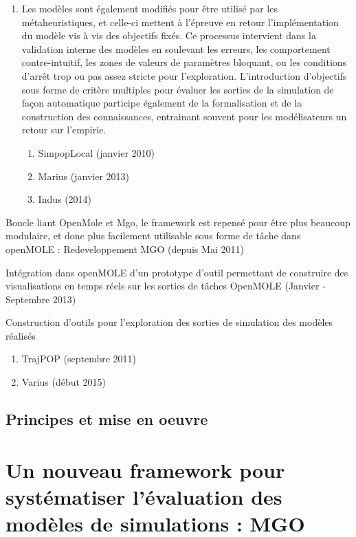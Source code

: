 \begin{myitemize2}
\begin{enumerate}
\item Les modèles sont également modifiés pour être utilisé par les métaheuristiques, et celle-ci mettent à l'épreuve en retour l'implémentation du modèle vis à vis des objectifs fixés. Ce processus intervient dans la validation interne des modèles en soulevant les erreurs, les comportement contre-intuitif, les zones de valeurs de paramètres bloquant, ou les conditions d'arrêt trop ou pas assez stricte pour l'exploration. L'introduction d'objectifs sous forme de critère multiples pour évaluer les sorties de la simulation de façon automatique participe également de la formalisation et de la construction des connaissances, entrainant souvent pour les modélisateurs un retour sur l'empirie.
\begin{enumerate}
 \item SimpopLocal (janvier 2010)
 \item Marius (janvier 2013)
 \item Indus (2014)
 \end{enumerate}
\end{enumerate}

\item[5] Boucle liant OpenMole et Mgo, le framework est repensé pour être plus beaucoup modulaire, et donc plus facilement utilisable sous forme de tâche dans openMOLE : Redeveloppement MGO (depuis Mai 2011)

\item[6] Intégration dans openMOLE d'un prototype d'outil permettant de construire des visualisations en temps réels sur les sorties de tâches OpenMOLE (Janvier - Septembre 2013)

\item[7]  Construction d'outils pour l'exploration des sorties de simulation des modèles réalisés
 \begin{enumerate}
 \item TrajPOP (septembre 2011)
 \item Varius (début 2015) 
 \end{enumerate}

\end{myitemize2}


\subsection{Principes et mise en oeuvre}

\section{Un nouveau framework pour systématiser l'évaluation des modèles de simulations : MGO}
\label{sec:MGO}

